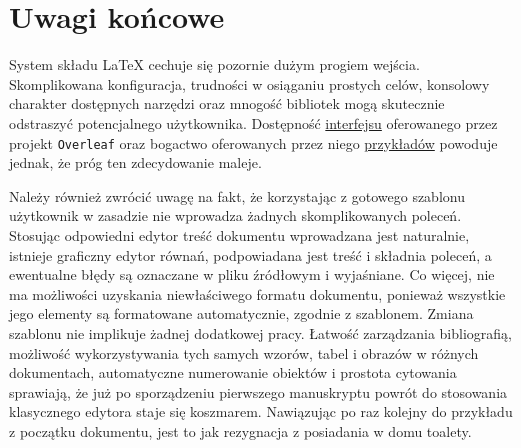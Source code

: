 \section{Uwagi końcowe}

System składu \LaTeX{} cechuje się pozornie dużym progiem wejścia. Skomplikowana konfiguracja, trudności w osiąganiu prostych celów, konsolowy charakter dostępnych narzędzi oraz mnogość bibliotek mogą skutecznie odstraszyć potencjalnego użytkownika. Dostępność \href{https://www.overleaf.com}{interfejsu} oferowanego przez projekt \texttt{Overleaf} oraz bogactwo oferowanych przez niego \href{https://www.overleaf.com/latex/examples}{przykładów} powoduje jednak, że próg ten zdecydowanie maleje.

Należy również zwrócić uwagę na fakt, że korzystając z gotowego szablonu użytkownik w zasadzie nie wprowadza żadnych skomplikowanych poleceń. Stosując odpowiedni edytor treść dokumentu wprowadzana jest naturalnie, istnieje graficzny edytor równań, podpowiadana jest treść i składnia poleceń, a ewentualne błędy są oznaczane w pliku źródłowym i wyjaśniane. Co więcej, nie ma możliwości uzyskania niewłaściwego formatu dokumentu, ponieważ wszystkie jego elementy są formatowane automatycznie, zgodnie z szablonem. Zmiana szablonu nie implikuje żadnej dodatkowej pracy. Łatwość zarządzania bibliografią, możliwość wykorzystywania tych samych wzorów, tabel i obrazów w różnych dokumentach, automatyczne numerowanie obiektów i prostota cytowania sprawiają, że już po sporządzeniu pierwszego manuskryptu powrót do stosowania klasycznego edytora staje się koszmarem. Nawiązując po raz kolejny do przykładu z początku dokumentu, jest to jak rezygnacja z posiadania w domu toalety.

